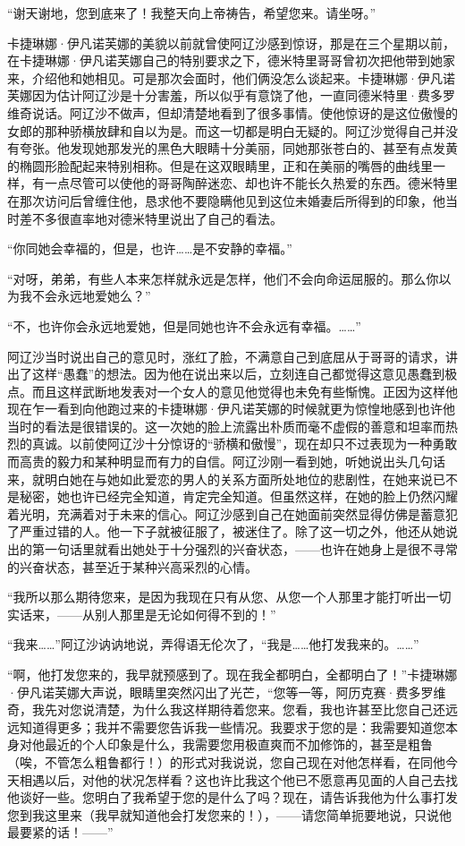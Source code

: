\par “谢天谢地，您到底来了！我整天向上帝祷告，希望您来。请坐呀。”
\par 卡捷琳娜·伊凡诺芙娜的美貌以前就曾使阿辽沙感到惊讶，那是在三个星期以前，在卡捷琳娜·伊凡诺芙娜自己的特别要求之下，德米特里哥哥曾初次把他带到她家来，介绍他和她相见。可是那次会面时，他们俩没怎么谈起来。卡捷琳娜·伊凡诺芙娜因为估计阿辽沙是十分害羞，所以似乎有意饶了他，一直同德米特里·费多罗维奇说话。阿辽沙不做声，但却清楚地看到了很多事情。使他惊讶的是这位傲慢的女郎的那种骄横放肆和自以为是。而这一切都是明白无疑的。阿辽沙觉得自己并没有夸张。他发现她那发光的黑色大眼睛十分美丽，同她那张苍白的、甚至有点发黄的椭圆形脸配起来特别相称。但是在这双眼睛里，正和在美丽的嘴唇的曲线里一样，有一点尽管可以使他的哥哥陶醉迷恋、却也许不能长久热爱的东西。德米特里在那次访问后曾缠住他，恳求他不要隐瞒他见到这位未婚妻后所得到的印象，他当时差不多很直率地对德米特里说出了自己的看法。
\par “你同她会幸福的，但是，也许……是不安静的幸福。”
\par “对呀，弟弟，有些人本来怎样就永远是怎样，他们不会向命运屈服的。那么你以为我不会永远地爱她么？”
\par “不，也许你会永远地爱她，但是同她也许不会永远有幸福。……”
\par 阿辽沙当时说出自己的意见时，涨红了脸，不满意自己到底屈从于哥哥的请求，讲出了这样“愚蠢”的想法。因为他在说出来以后，立刻连自己都觉得这意见愚蠢到极点。而且这样武断地发表对一个女人的意见他觉得也未免有些惭愧。正因为这样他现在乍一看到向他跑过来的卡捷琳娜·伊凡诺芙娜的时候就更为惊惶地感到也许他当时的看法是很错误的。这一次她的脸上流露出朴质而毫不虚假的善意和坦率而热烈的真诚。以前使阿辽沙十分惊讶的“骄横和傲慢”，现在却只不过表现为一种勇敢而高贵的毅力和某种明显而有力的自信。阿辽沙刚一看到她，听她说出头几句话来，就明白她在与她如此爱恋的男人的关系方面所处地位的悲剧性，在她来说已不是秘密，她也许已经完全知道，肯定完全知道。但虽然这样，在她的脸上仍然闪耀着光明，充满着对于未来的信心。阿辽沙感到自己在她面前突然显得仿佛是蓄意犯了严重过错的人。他一下子就被征服了，被迷住了。除了这一切之外，他还从她说出的第一句话里就看出她处于十分强烈的兴奋状态，——也许在她身上是很不寻常的兴奋状态，甚至近于某种兴高采烈的心情。
\par “我所以那么期待您来，是因为我现在只有从您、从您一个人那里才能打听出一切实话来，——从别人那里是无论如何得不到的！”
\par “我来……”阿辽沙讷讷地说，弄得语无伦次了，“我是……他打发我来的。……”
\par “啊，他打发您来的，我早就预感到了。现在我全都明白，全都明白了！”卡捷琳娜·伊凡诺芙娜大声说，眼睛里突然闪出了光芒，“您等一等，阿历克赛·费多罗维奇，我先对您说清楚，为什么我这样期待着您来。您看，我也许甚至比您自己还远远知道得更多；我并不需要您告诉我一些情况。我要求于您的是：我需要知道您本身对他最近的个人印象是什么，我需要您用极直爽而不加修饰的，甚至是粗鲁（唉，不管怎么粗鲁都行！）的形式对我说说，您自己现在对他怎样看，在同他今天相遇以后，对他的状况怎样看？这也许比我这个他已不愿意再见面的人自己去找他谈好一些。您明白了我希望于您的是什么了吗？现在，请告诉我他为什么事打发您到我这里来（我早就知道他会打发您来的！），——请您简单扼要地说，只说他最要紧的话！——”
